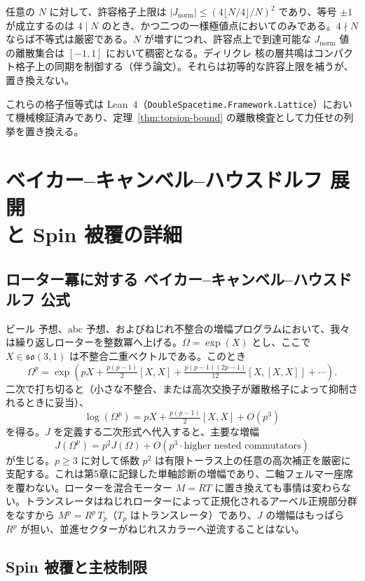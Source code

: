 \documentclass[a4paper]{article}
\theoremstyle{definition}
\theoremstyle{remark}
\newcommand{\Jnorm}{J_{\mathrm{norm}}}
\begin{document}
任意の \( N \) に対して、許容格子上限は \(|\Jnorm|\le(4\lfloor N/4\rfloor/N)^2\) であり、等号 \(\pm 1\) が成立するのは \(4\mid N\) のとき、かつ二つの一様極値点においてのみである。\(4\nmid N\) ならば不等式は厳密である。\( N \) が増すにつれ、許容点上で到達可能な \(\Jnorm\) 値の離散集合は \([-1,1]\) において稠密となる。ディリクレ 核の層共鳴はコンパクト格子上の同期を制御する（伴う論文）。それらは初等的な許容上限を補うが、置き換えない。

これらの格子恒等式は Lean~4（\texttt{DoubleSpacetime.Framework.Lattice}）において機械検証済みであり、定理~\ref{thm:torsion-bound} の離散検査として力任せの列挙を置き換える。

\section[ベイカー–キャンベル–ハウスドルフ 展開と Spin 被覆]{ベイカー–キャンベル–ハウスドルフ 展開\\ と Spin 被覆の詳細}

\subsection{ローター冪に対する ベイカー–キャンベル–ハウスドルフ 公式}

ビール 予想、abc 予想、およびねじれ不整合の増幅プログラムにおいて、我々は繰り返しローターを整数冪へ上げる。\(\Omega = \exp(X)\) とし、ここで \( X \in \mathfrak{so}(3,1) \) は不整合二重ベクトルである。このとき
\[
\Omega^p = \exp(pX + \tfrac{p(p-1)}{2}[X,X] + \tfrac{p(p-1)(2p-1)}{12}[X,[X,X]] + \cdots).
\]
二次で打ち切ると（小さな不整合、または高次交換子が離散格子によって抑制されるときに妥当）、
\[
\log(\Omega^p) = pX + \tfrac{p(p-1)}{2}[X,X] + O(p^3)
\]
を得る。\( J \) を定義する二次形式へ代入すると、主要な増幅
\[
J(\Omega^p) = p^2 J(\Omega) + O(p^3 \cdot \text{higher nested commutators})
\]
が生じる。\( p \geq 3 \) に対して係数 \( p^2 \) は有限トーラス上の任意の高次補正を厳密に支配する。これは第5章に記録した単軸診断の増幅であり、二軸フェルマー座席を覆わない。ローターを混合モーター \( M=RT \) に置き換えても事情は変わらない。トランスレータはねじれローターによって正規化されるアーベル正規部分群をなすから \( M^p = R^p\,T_p \)（\( T_p \) はトランスレータ）であり、\( J \) の増幅はもっぱら \( R^p \) が担い、並進セクターがねじれスカラーへ逆流することはない。

\subsection{Spin 被覆と主枝制限}
\end{document}
